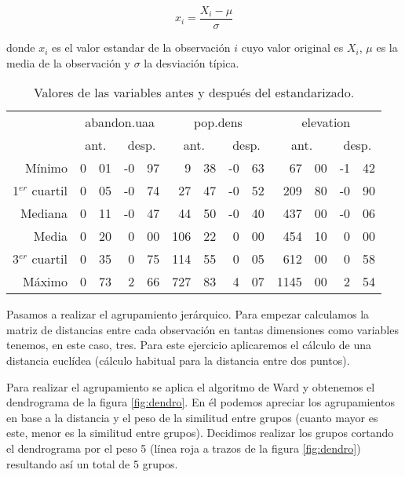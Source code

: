 \documentclass[11pt,a4paper]{article}
\begin{document}
\begin{equation}
x_{i}=\frac{X_{i}-\mu}{\sigma}
\label{eq:estandar}
\end{equation}

\noindent donde $x_{i}$ es el valor estandar de la observación $i$ cuyo valor original es $X_{i}$, $\mu$ es la media de la observación y $\sigma$ la desviación típica.

\begin{table}[ht]
\centering
\begin{tabular}{rr@{,}lr@{,}lr@{,}lr@{,}lr@{,}lr@{,}l}
\toprule[0,4mm]
& \multicolumn{4}{c}{abandon.uaa} & \multicolumn{4}{c}{pop.dens} & \multicolumn{4}{c}{elevation}\\
& \multicolumn{2}{c}{ant.} & \multicolumn{2}{c}{desp.} & \multicolumn{2}{c}{ant.} & \multicolumn{2}{c}{desp.} & \multicolumn{2}{c}{ant.} & \multicolumn{2}{c}{desp.}\\
\midrule
Mínimo & 0&01 & -0&97 & 9&38 & -0&63 & 67&00 & -1&42\\ 
1$^{er}$ cuartil & 0&05 & -0&74 & 27&47 & -0&52 & 209&80 & -0&90\\
Mediana & 0&11 & -0&47 & 44&50 & -0&40 & 437&00 & -0&06\\
Media & 0&20 & 0&00 & 106&22 & 0&00 & 454&10 & 0&00\\
3$^{er}$ cuartil & 0&35 & 0&75 & 114&55 & 0&05 & 612&00 & 0&58\\
Máximo & 0&73 & 2&66 & 727&83 & 4&07 & 1145&00 & 2&54\\
\bottomrule[0.4mm]
\end{tabular}
\caption{Valores de las variables antes y después del estandarizado.}
\label{tab:estand}
\end{table}

Pasamos a realizar el agrupamiento jerárquico. Para empezar calculamos la matriz de distancias entre cada observación en tantas dimensiones como variables tenemos, en este caso, tres. Para este ejercicio aplicaremos el cálculo de una distancia euclídea (cálculo habitual para la distancia entre dos puntos).

Para realizar el agrupamiento se aplica el algoritmo de Ward y obtenemos el dendrograma de la figura \ref{fig:dendro}. En él podemos apreciar los agrupamientos en base a la distancia y el peso de la similitud entre grupos (cuanto mayor es este, menor es la similitud entre grupos). Decidimos realizar los grupos cortando el dendrograma por el peso 5 (línea roja a trazos de la figura \ref{fig:dendro}) resultando así un total de 5 grupos.
\end{document}
